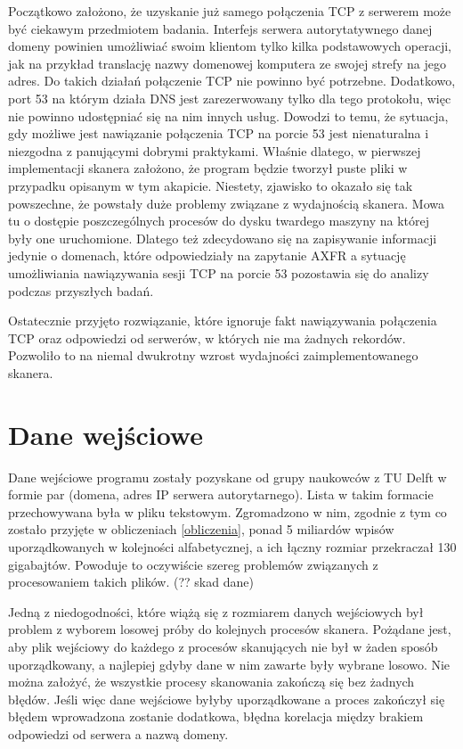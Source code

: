 Początkowo założono, że uzyskanie już samego połączenia TCP z serwerem może być ciekawym przedmiotem badania. Interfejs serwera
autorytatywnego danej domeny powinien umożliwiać swoim klientom tylko kilka podstawowych operacji, jak na przykład translację nazwy
domenowej komputera ze swojej strefy na jego adres. Do takich działań połączenie TCP nie powinno być potrzebne. Dodatkowo, port 53 na którym działa
DNS jest zarezerwowany tylko dla tego protokołu, więc nie powinno udostępniać się na nim innych usług. Dowodzi to temu, że sytuacja,
gdy możliwe jest nawiązanie połączenia TCP na porcie 53 jest nienaturalna i niezgodna z panującymi dobrymi praktykami. Właśnie dlatego,
w pierwszej implementacji skanera założono, że program będzie tworzył puste pliki w przypadku opisanym w tym akapicie. Niestety,
zjawisko to okazało się tak powszechne, że powstały duże problemy związane z wydajnością skanera. Mowa tu o dostępie poszczególnych
procesów do dysku twardego maszyny na której były one uruchomione. Dlatego też zdecydowano się na zapisywanie informacji jedynie o
domenach, które odpowiedziały na zapytanie AXFR a sytuację umożliwiania nawiązywania sesji TCP na porcie 53 pozostawia się do analizy
podczas przyszłych badań.

Ostatecznie przyjęto rozwiązanie, które ignoruje fakt nawiązywania połączenia TCP oraz odpowiedzi od serwerów, w których nie ma
żadnych rekordów. Pozwoliło to na niemal dwukrotny wzrost wydajności zaimplementowanego skanera.

\section{Dane wejściowe}
Dane wejściowe programu zostały pozyskane od grupy naukowców z TU Delft \cite{delft} w formie par (domena, adres IP serwera
autorytarnego). Lista w takim formacie przechowywana była w pliku tekstowym. Zgromadzono w nim, zgodnie z tym co zostało przyjęte
w obliczeniach \ref{obliczenia}, ponad 5 miliardów wpisów uporządkowanych w kolejności alfabetycznej, a ich łączny rozmiar przekraczał
130 gigabajtów. Powoduje to oczywiście szereg problemów związanych z procesowaniem takich plików. (?? skad dane)

Jedną z niedogodności, które wiążą się z rozmiarem danych wejściowych był problem z wyborem losowej próby do kolejnych procesów
skanera. Pożądane jest, aby plik wejściowy do każdego z procesów skanujących nie był w żaden sposób uporządkowany, a najlepiej
gdyby dane w nim zawarte były wybrane losowo. Nie można założyć, że wszystkie procesy skanowania zakończą się bez żadnych błędów.
Jeśli więc dane wejściowe byłyby uporządkowane a proces zakończył się błędem wprowadzona zostanie dodatkowa, błędna korelacja między
brakiem odpowiedzi od serwera a nazwą domeny.

